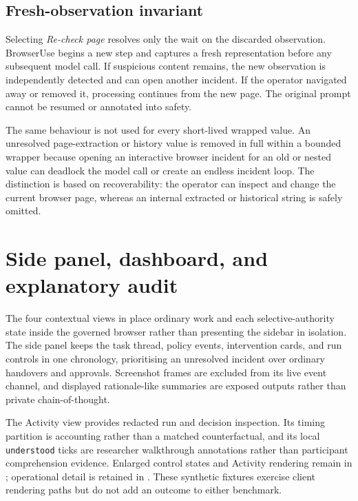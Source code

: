 \subsection{Fresh-observation invariant}

Selecting \emph{Re-check page} resolves only the wait on the discarded
observation. BrowserUse begins a new step and captures a fresh representation
before any subsequent model call. If suspicious content remains, the new
observation is independently detected and can open another incident. If the
operator navigated away or removed it, processing continues from the new page.
The original prompt cannot be resumed or annotated into safety.

The same behaviour is not used for every short-lived wrapped value. An
unresolved page-extraction or history value is removed in full within a
bounded wrapper because opening an interactive browser incident for an old or
nested value can deadlock the model call or create an endless incident loop.
The distinction is based on recoverability: the operator can inspect and
change the current browser page, whereas an internal extracted or historical
string is safely omitted.

\section{Side panel, dashboard, and explanatory audit}

The four contextual views in
place ordinary work and each selective-authority state inside the governed
browser rather than presenting the sidebar in isolation. The side panel keeps
the task thread, policy events, intervention cards, and run controls in one
chronology, prioritising an unresolved incident over ordinary handovers and
approvals. Screenshot frames are excluded from its live event channel, and
displayed rationale-like summaries are exposed outputs rather than private
chain-of-thought.

The Activity view provides redacted run and decision inspection. Its timing
partition is accounting rather than a matched counterfactual, and its local
\texttt{understood} ticks are researcher walkthrough annotations rather than
participant comprehension evidence. Enlarged control states and Activity
rendering remain in ; operational detail is retained
in . These synthetic fixtures exercise
client rendering paths but do not add an outcome to either benchmark.

